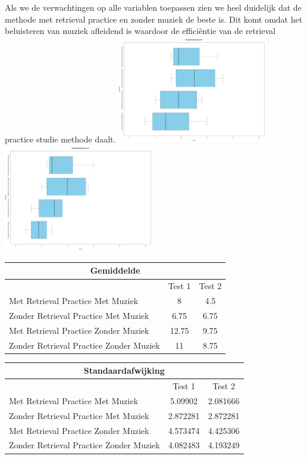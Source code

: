 \documentclass{hogent-article}
\begin{document}
	Als we de verwachtingen op alle variablen toepassen zien we heel duidelijk dat de methode met retrieval practice en zonder muziek de beste is. Dit komt omdat het beluisteren van muziek afleidend is waardoor de efficiëntie van de retrieval practice studie methode daalt. 
	\includegraphics[width=250px]{Verwacht_MuziekRT_Score1}
	\includegraphics[width=250px]{Verwacht_MuziekRT_Score2}
	\begin{tabular}{ |p{10em}|c|c| }
	\hline
		\multicolumn{3}{|c|}{Gemiddelde} \\
	\hline
		& Test 1 & Test 2 \\
	\hline
		Met Retrieval Practice Met Muziek  & 8 & 4.5 \\
	\hline
		Zonder Retrieval Practice Met Muziek & 6.75 & 6.75 \\
	\hline
		Met Retrieval Practice Zonder Muziek & 12.75  & 9.75 \\
	\hline
		Zonder Retrieval Practice Zonder Muziek & 11 & 8.75 \\
	\hline
	\end{tabular}
	
	\begin{tabular}{ |p{10em}|c|c| }
	\hline
		\multicolumn{3}{|c|}{Standaardafwijking} \\
	\hline
		& Test 1 & Test 2 \\
	\hline
		Met Retrieval Practice Met Muziek  & 5.09902 & 2.081666 \\
	\hline
		Zonder Retrieval Practice Met Muziek & 2.872281 & 2.872281 \\
	\hline
		Met Retrieval Practice Zonder Muziek & 4.573474  & 4.425306 \\
	\hline
		Zonder Retrieval Practice Zonder Muziek & 4.082483 & 4.193249 \\
	\hline
	\end{tabular}
			
\end{document}
